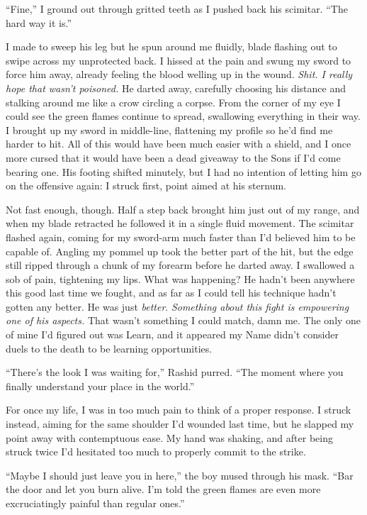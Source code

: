 \documentclass[12pt, openany]{book}
\begin{document}
“Fine,” I ground out through gritted teeth as I pushed back his scimitar. “The hard way it is.”

I made to sweep his leg but he spun around me fluidly, blade flashing out to swipe across my unprotected back. I hissed at the pain and swung my sword to force him away, already feeling the blood welling up in the wound. \textit{Shit. I really hope that wasn’t poisoned.} He darted away, carefully choosing his distance and stalking around me like a crow circling a corpse. From the corner of my eye I could see the green flames continue to spread, swallowing everything in their way. I brought up my sword in middle-line, flattening my profile so he’d find me harder to hit. All of this would have been much easier with a shield, and I once more cursed that it would have been a dead giveaway to the Sons if I’d come bearing one. His footing shifted minutely, but I had no intention of letting him go on the offensive again: I struck first, point aimed at his sternum. 

Not fast enough, though. Half a step back brought him just out of my range, and when my blade retracted he followed it in a single fluid movement. The scimitar flashed again, coming for my sword-arm much faster than I’d believed him to be capable of. Angling my pommel up took the better part of the hit, but the edge still ripped through a chunk of my forearm before he darted away. I swallowed a sob of pain, tightening my lips. What was happening? He hadn’t been anywhere this good last time we fought, and as far as I could tell his technique hadn’t gotten any better. He was just \textit{better}. \textit{Something about this fight is empowering one of his aspects.} That wasn’t something I could match, damn me. The only one of mine I’d figured out was Learn, and it appeared my Name didn’t consider duels to the death to be learning opportunities.

“There’s the look I was waiting for,” Rashid purred. “The moment where you finally understand your place in the world.”

For once my life, I was in too much pain to think of a proper response. I struck instead, aiming for the same shoulder I’d wounded last time, but he slapped my point away with contemptuous ease. My hand was shaking, and after being struck twice I’d hesitated too much to properly commit to the strike.

“Maybe I should just leave you in here,” the boy mused through his mask. “Bar the door and let you burn alive. I’m told the green flames are even more excruciatingly painful than regular ones.”
\end{document}
